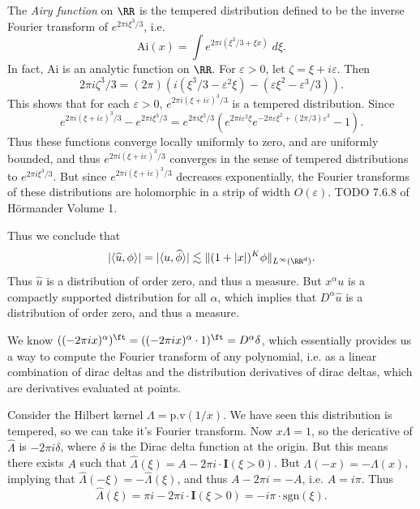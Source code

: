 \begin{example}
    The \emph{Airy function} on $\RR$ is the tempered distribution defined to be the inverse Fourier transform of $e^{2 \pi i \xi^3 / 3}$, i.e.
    \[ \text{Ai}(x) = \int e^{2 \pi i (\xi^3 / 3 + \xi x)}\; d\xi. \]
    In fact, $\text{Ai}$ is an analytic function on $\RR$. For $\varepsilon > 0$, let $\zeta = \xi + i \varepsilon$. Then
    \[ 2 \pi i \zeta^3 / 3 = (2\pi) \left( i ( \xi^3 / 3 - \varepsilon^2 \xi) - (\varepsilon \xi^2 - \varepsilon^3 / 3) \right). \]
    This shows that for each $\varepsilon > 0$, $e^{2 \pi i (\xi + i \varepsilon)^3 / 3}$ is a tempered distribution. Since
    \[ e^{2 \pi i (\xi + i \varepsilon)^3 / 3} - e^{2 \pi i \xi^3 / 3} = e^{2 \pi i \xi^3 / 3} \left( e^{2 \pi i \varepsilon^2 \xi} e^{- 2 \pi \varepsilon \xi^2 + (2 \pi / 3) \varepsilon^3} - 1 \right).  \]
    Thus these functions converge locally uniformly to zero, and are uniformly bounded, and thus $e^{2 \pi i(\xi + i \varepsilon)^3 / 3}$ converges in the sense of tempered distributions to $e^{2 \pi i \xi^3 / 3}$. But since $e^{2\pi i (\xi + i \varepsilon)^3 / 3}$ decreases exponentially, the Fourier transforms of these distributions are holomorphic in a strip of width $O(\varepsilon)$. TODO 7.6.8 of H\"{o}rmander Volume 1.
\end{example}

Thus we conclude that
%
\[ |\langle \widehat{u}, \phi \rangle| = |\langle u, \widehat{\phi} \rangle| \lesssim \| (1 + |x|)^K \phi \|_{L^\infty(\RR^d)}. \]
%
Thus $\widehat{u}$ is a distribution of order zero, and thus a measure. But $x^\alpha u$ is a compactly supported distribution for all $\alpha$, which implies that $D^\alpha \widehat{u}$ is a distribution of order zero, and thus a measure. 

\begin{example}
    We know $((-2 \pi i x)^\alpha)^\ft = ((- 2 \pi i x)^\alpha \cdot 1)^\ft = D^\alpha \delta$, which essentially provides us a way to compute the Fourier transform of any polynomial, i.e. as a linear combination of dirac deltas and the distribution derivatives of dirac deltas, which are derivatives evaluated at points.
\end{example}

\begin{example}
    Consider the Hilbert kernel $\Lambda = \text{p.v}(1/x)$. We have seen this distribution is tempered, so we can take it's Fourier transform. Now $x \Lambda = 1$, so the dericative of $\widehat{\Lambda}$ is $- 2 \pi i \delta$, where $\delta$ is the Dirac delta function at the origin. But this means there exists $A$ such that $\widehat{\Lambda}(\xi) = A - 2 \pi i \cdot \mathbf{I}(\xi > 0)$. But $\Lambda(-x) = - \Lambda(x)$, implying that $\widehat{\Lambda}(-\xi) = -\widehat{\Lambda}(\xi)$, and thus $A - 2 \pi i = -A$, i.e. $A = i \pi$. Thus
    \[ \widehat{\Lambda}(\xi) = \pi i - 2 \pi i \cdot \mathbf{I}(\xi > 0) = - i \pi \cdot \text{sgn}(\xi). \]
\end{example}

